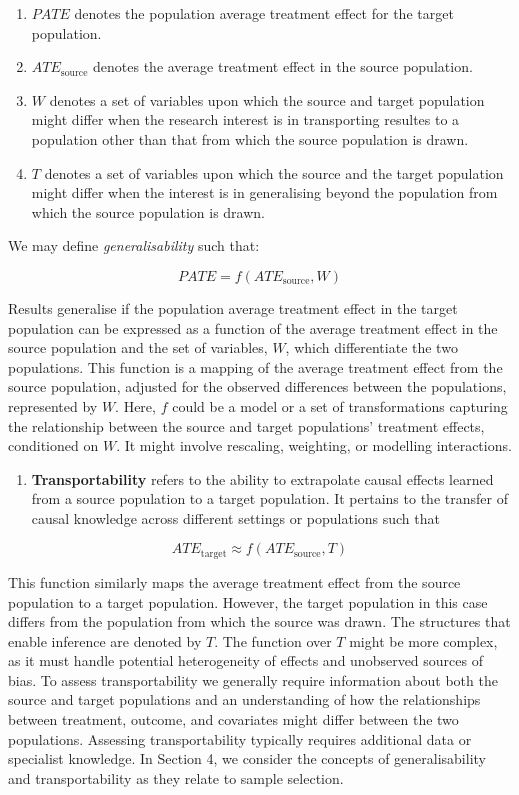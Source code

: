 \documentclass[
  singlecolumn]{report}
\providecommand{\tightlist}{%
  \setlength{\itemsep}{0pt}\setlength{\parskip}{0pt}}\usepackage{longtable,booktabs,array}
\begin{document}
\begin{enumerate}
\def\labelenumi{\alph{enumi}.}
\tightlist
\item
  \(PATE\) denotes the population average treatment effect for the
  target population.
\item
  \(ATE_{\text{source}}\) denotes the average treatment effect in the
  source population.
\item
  \(W\) denotes a set of variables upon which the source and target
  population might differ when the research interest is in transporting
  resultes to a population other than that from which the source
  population is drawn.
\item
  \(T\) denotes a set of variables upon which the source and the target
  population might differ when the interest is in generalising beyond
  the population from which the source population is drawn.
\end{enumerate}

We may define \emph{generalisability} such that:

\[PATE =  f(ATE_{\text{source}}, W)\]

Results generalise if the population average treatment effect in the
target population can be expressed as a function of the average
treatment effect in the source population and the set of variables,
\(W\), which differentiate the two populations. This function is a
mapping of the average treatment effect from the source population,
adjusted for the observed differences between the populations,
represented by \(W\). Here, \(f\) could be a model or a set of
transformations capturing the relationship between the source and target
populations' treatment effects, conditioned on \(W\). It might involve
rescaling, weighting, or modelling interactions.

\begin{enumerate}
\def\labelenumi{\arabic{enumi}.}
\setcounter{enumi}{3}
\tightlist
\item
  \textbf{Transportability} refers to the ability to extrapolate causal
  effects learned from a source population to a target population. It
  pertains to the transfer of causal knowledge across different settings
  or populations such that
\end{enumerate}

\[ATE_{\text{target}} \approx f(ATE_{\text{source}}, T)\]

This function similarly maps the average treatment effect from the
source population to a target population. However, the target population
in this case differs from the population from which the source was
drawn. The structures that enable inference are denoted by \(T\). The
function over \(T\) might be more complex, as it must handle potential
heterogeneity of effects and unobserved sources of bias. To assess
transportability we generally require information about both the source
and target populations and an understanding of how the relationships
between treatment, outcome, and covariates might differ between the two
populations. Assessing transportability typically requires additional
data or specialist knowledge. In Section 4, we consider the concepts of
generalisability and transportability as they relate to sample
selection.
\end{document}
